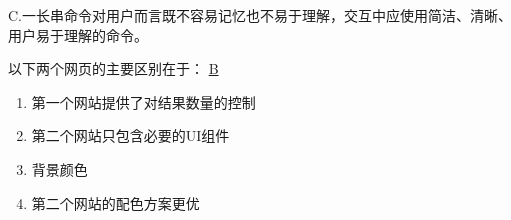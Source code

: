 \begin{solution}
C.一长串命令对用户而言既不容易记忆也不易于理解，交互中应使用简洁、清晰、用户易于理解的命令。
\end{solution}


\begin{problem}
	以下两个网页的主要区别在于：
	\uline{B}
\begin{figure}[H]
	\setcounter{subfigure}{0}
	\centering
	\vspace{-0.5em}	
    \hfill
	\vspace{-1em}
\end{figure}
    \vspace{-0.8em}
    \begin{multicols}{2}
        \begin{enumerate}[label=\Alph*.]
            \item 第一个网站提供了对结果数量的控制
            \item 第二个网站只包含必要的UI组件
            \item 背景颜色
            \item 第二个网站的配色方案更优
        \end{enumerate}
    \end{multicols}
    \vspace{-1em}
\end{problem}

